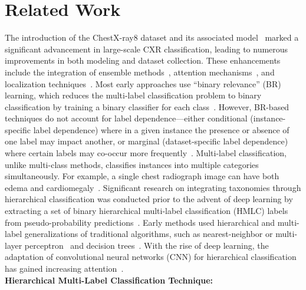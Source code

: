 \section{Related Work}\label{sec:taxonomy.relatedwork}
The introduction of the ChestX-ray8 dataset and its associated model~\cite{wang_ChestXRay8_2017} marked a significant advancement in large-scale CXR classification, leading to numerous improvements in both modeling and dataset collection. These enhancements include the integration of ensemble methods~\cite{islam_Abnormality_2017}, attention mechanisms~\cite{guan_Diagnose_2018,liu_SDFN_2019}, and localization techniques~\cite{cai_Iterative_2018,guendel_MultiTask_2019,li_Thoracic_2018,yan_Weakly_2018}. Most early approaches use ``binary relevance'' (BR) learning, which reduces the multi-label classification problem to binary classification by training a binary classifier for each class~\cite{zhang_Review_2014}. However, BR-based techniques do not account for label dependence---either conditional (instance-specific label dependence) where in a given instance the presence or absence of one label may impact another, or marginal (dataset-specific label dependence) where certain labels may co-occur more frequently~\cite{dembczynski_Label_2012}.
Multi-label classification, unlike multi-class methods, classifies instances into multiple categories simultaneously. For example, a single chest radiograph image can have both edema and cardiomegaly~\cite{harvey_Standardised_2019,tsoumakas_MultiLabel_2007}. Significant research on integrating taxonomies through hierarchical classification was conducted prior to the advent of deep learning by extracting a set of binary hierarchical multi-label classification (HMLC) labels from pseudo-probability predictions~\cite{bi_BayesOptimal_2015}. Early methods used hierarchical and multi-label generalizations of traditional algorithms, such as nearest-neighbor or multi-layer perceptron~\cite{pourghassem_ContentBased_2008} and decision trees~\cite{dimitrovski_Hierarchical_2011}. With the rise of deep learning, the adaptation of convolutional neural networks (CNN) for hierarchical classification has gained increasing attention~\cite{guo_CNNRNN_2018,kowsari_HDLTex_2017,redmon_YOLO9000_2017,roy_TreeCNN_2020}. \\
%
\textbf{Hierarchical Multi-Label Classification Technique: }
